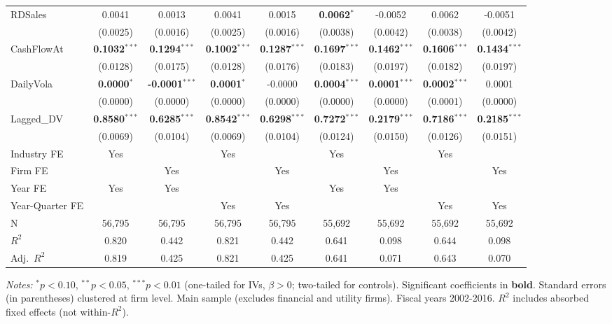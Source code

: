 \begin{landscape}
\begin{table}[H]
\begin{tabular}{lcccccccc}
RDSales & 0.0041 & 0.0013 & 0.0041 & 0.0015 & \textbf{0.0062}$^{*}$ & -0.0052 & 0.0062 & -0.0051 \\
 & (0.0025) & (0.0016) & (0.0025) & (0.0016) & (0.0038) & (0.0042) & (0.0038) & (0.0042) \\
CashFlowAt & \textbf{0.1032}$^{***}$ & \textbf{0.1294}$^{***}$ & \textbf{0.1002}$^{***}$ & \textbf{0.1287}$^{***}$ & \textbf{0.1697}$^{***}$ & \textbf{0.1462}$^{***}$ & \textbf{0.1606}$^{***}$ & \textbf{0.1434}$^{***}$ \\
 & (0.0128) & (0.0175) & (0.0128) & (0.0176) & (0.0183) & (0.0197) & (0.0182) & (0.0197) \\
DailyVola & \textbf{0.0000}$^{*}$ & \textbf{-0.0001}$^{***}$ & \textbf{0.0001}$^{*}$ & -0.0000 & \textbf{0.0004}$^{***}$ & \textbf{0.0001}$^{***}$ & \textbf{0.0002}$^{***}$ & 0.0001 \\
 & (0.0000) & (0.0000) & (0.0000) & (0.0000) & (0.0000) & (0.0000) & (0.0001) & (0.0000) \\
Lagged\_DV & \textbf{0.8580}$^{***}$ & \textbf{0.6285}$^{***}$ & \textbf{0.8542}$^{***}$ & \textbf{0.6298}$^{***}$ & \textbf{0.7272}$^{***}$ & \textbf{0.2179}$^{***}$ & \textbf{0.7186}$^{***}$ & \textbf{0.2185}$^{***}$ \\
 & (0.0069) & (0.0104) & (0.0069) & (0.0104) & (0.0124) & (0.0150) & (0.0126) & (0.0151) \\
\midrule
Industry FE & Yes &  & Yes &  & Yes &  & Yes &  \\
Firm FE &  & Yes &  & Yes &  & Yes &  & Yes \\
Year FE & Yes & Yes &  &  & Yes & Yes &  &  \\
Year-Quarter FE &  &  & Yes & Yes &  &  & Yes & Yes \\
\midrule
N & 56,795 & 56,795 & 56,795 & 56,795 & 55,692 & 55,692 & 55,692 & 55,692 \\
$R^2$ & 0.820 & 0.442 & 0.821 & 0.442 & 0.641 & 0.098 & 0.644 & 0.098 \\
Adj.~$R^2$ & 0.819 & 0.425 & 0.821 & 0.425 & 0.641 & 0.071 & 0.643 & 0.070 \\
\bottomrule
\end{tabular}
\begin{minipage}{\linewidth}
\vspace{2pt}\scriptsize
\textit{Notes:} $^{*}p<0.10$, $^{**}p<0.05$, $^{***}p<0.01$ (one-tailed for IVs, $\beta > 0$; two-tailed for controls).
 Significant coefficients in \textbf{bold}.
 Standard errors (in parentheses) clustered at firm level.
 Main sample (excludes financial and utility firms). Fiscal years 2002-2016.
 $R^2$ includes absorbed fixed effects (not within-$R^2$).
\end{minipage}
\end{table}
\end{landscape}